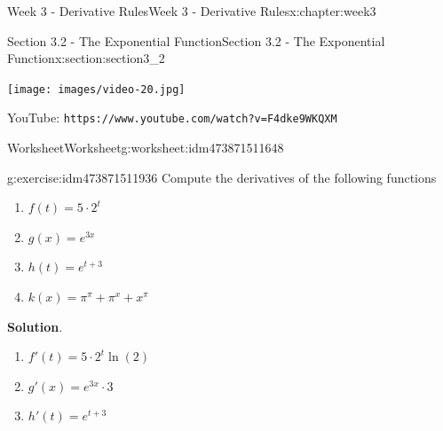 \documentclass[oneside,10pt,]{book}
\newcommand{\blocktitlefont}{\relax}
\newcommand{\mono}[1]{\texttt{#1}}
\numberwithin{equation}{section}
\newlength{\qrsize}
\newlength{\previewwidth}
\begin{document}
\begin{chapterptx}{Week 3 - Derivative Rules}{}{Week 3 - Derivative Rules}{}{}{x:chapter:week3}
\typeout{************************************************}
%
\begin{sectionptx}{Section 3.2 - The Exponential Function}{}{Section 3.2 - The Exponential Function}{}{}{x:section:section3_2}
\setlength{\qrsize}{9em}
\setlength{\previewwidth}{\linewidth}
\addtolength{\previewwidth}{-\qrsize}
\begin{tcbraster}[raster columns=2, raster column skip=1pt, raster halign=center, raster force size=false, raster left skip=0pt, raster right skip=0pt]%
\begin{tcolorbox}[previewstyle, width=\previewwidth]%
\texttt{[image: images/video-20.jpg]}%
\end{tcolorbox}%
\begin{tcolorbox}[qrstyle]%
{\hypersetup{urlcolor=black}}%
\end{tcolorbox}%
\begin{tcolorbox}[captionstyle]%
\small YouTube: \mono{https://www.youtube.com/watch?v=F4dke9WKQXM}\end{tcolorbox}%
\end{tcbraster}%
%
%
\typeout{************************************************}
\typeout{************************************************}
%
\begin{worksheet-subsection}{Worksheet}{}{Worksheet}{}{}{g:worksheet:idm473871511648}
\begin{divisionexercise}{1}{}{}{g:exercise:idm473871511936}%
Compute the derivatives of the following functions%
%
\begin{enumerate}[label=(\alph*)]
\item{}\(\displaystyle f(t) = 5\cdot 2^t\)%
\item{}\(\displaystyle g(x) = e^{3x}\)%
\item{}\(\displaystyle h(t) = e^{t+3}\)%
\item{}\(\displaystyle k(x) = \pi^{\pi}+\pi^x+x^{\pi}\)%
\end{enumerate}
\textbf{\blocktitlefont Solution}.\hypertarget{g:solution:idm473871511392}{}\quad{}%
\begin{enumerate}[label=(\alph*)]
\item{}\(\displaystyle f'(t) = 5\cdot 2^t \ln(2)\)%
\item{}\(\displaystyle g'(x) = e^{3x}\cdot 3\)%
\item{}\(\displaystyle h'(t) = e^{t+3}\)%

\end{enumerate}
\end{divisionexercise}
\end{worksheet-subsection}
\end{sectionptx}
\end{chapterptx}
\end{document}
